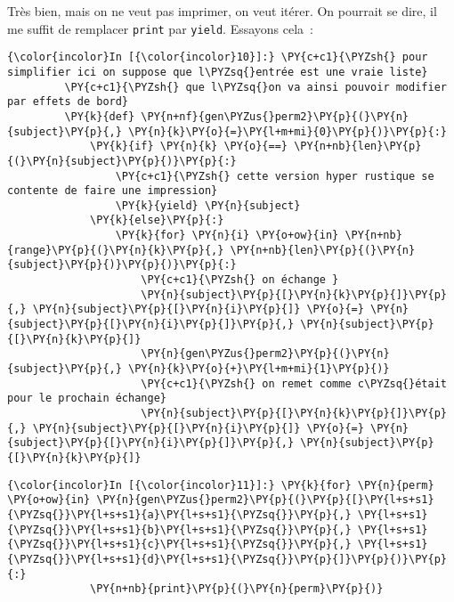     Très bien, mais on ne veut pas imprimer, on veut itérer. On pourrait se
dire, il me suffit de remplacer \texttt{print} par \texttt{yield}.
Essayons cela~:

    \begin{Verbatim}[commandchars=\\\{\}]
{\color{incolor}In [{\color{incolor}10}]:} \PY{c+c1}{\PYZsh{} pour simplifier ici on suppose que l\PYZsq{}entrée est une vraie liste}
         \PY{c+c1}{\PYZsh{} que l\PYZsq{}on va ainsi pouvoir modifier par effets de bord}
         \PY{k}{def} \PY{n+nf}{gen\PYZus{}perm2}\PY{p}{(}\PY{n}{subject}\PY{p}{,} \PY{n}{k}\PY{o}{=}\PY{l+m+mi}{0}\PY{p}{)}\PY{p}{:}
             \PY{k}{if} \PY{n}{k} \PY{o}{==} \PY{n+nb}{len}\PY{p}{(}\PY{n}{subject}\PY{p}{)}\PY{p}{:}
                 \PY{c+c1}{\PYZsh{} cette version hyper rustique se contente de faire une impression}
                 \PY{k}{yield} \PY{n}{subject}
             \PY{k}{else}\PY{p}{:}
                 \PY{k}{for} \PY{n}{i} \PY{o+ow}{in} \PY{n+nb}{range}\PY{p}{(}\PY{n}{k}\PY{p}{,} \PY{n+nb}{len}\PY{p}{(}\PY{n}{subject}\PY{p}{)}\PY{p}{)}\PY{p}{:}
                     \PY{c+c1}{\PYZsh{} on échange }
                     \PY{n}{subject}\PY{p}{[}\PY{n}{k}\PY{p}{]}\PY{p}{,} \PY{n}{subject}\PY{p}{[}\PY{n}{i}\PY{p}{]} \PY{o}{=} \PY{n}{subject}\PY{p}{[}\PY{n}{i}\PY{p}{]}\PY{p}{,} \PY{n}{subject}\PY{p}{[}\PY{n}{k}\PY{p}{]}
                     \PY{n}{gen\PYZus{}perm2}\PY{p}{(}\PY{n}{subject}\PY{p}{,} \PY{n}{k}\PY{o}{+}\PY{l+m+mi}{1}\PY{p}{)}
                     \PY{c+c1}{\PYZsh{} on remet comme c\PYZsq{}était pour le prochain échange}
                     \PY{n}{subject}\PY{p}{[}\PY{n}{k}\PY{p}{]}\PY{p}{,} \PY{n}{subject}\PY{p}{[}\PY{n}{i}\PY{p}{]} \PY{o}{=} \PY{n}{subject}\PY{p}{[}\PY{n}{i}\PY{p}{]}\PY{p}{,} \PY{n}{subject}\PY{p}{[}\PY{n}{k}\PY{p}{]}
\end{Verbatim}


    \begin{Verbatim}[commandchars=\\\{\}]
{\color{incolor}In [{\color{incolor}11}]:} \PY{k}{for} \PY{n}{perm} \PY{o+ow}{in} \PY{n}{gen\PYZus{}perm2}\PY{p}{(}\PY{p}{[}\PY{l+s+s1}{\PYZsq{}}\PY{l+s+s1}{a}\PY{l+s+s1}{\PYZsq{}}\PY{p}{,} \PY{l+s+s1}{\PYZsq{}}\PY{l+s+s1}{b}\PY{l+s+s1}{\PYZsq{}}\PY{p}{,} \PY{l+s+s1}{\PYZsq{}}\PY{l+s+s1}{c}\PY{l+s+s1}{\PYZsq{}}\PY{p}{,} \PY{l+s+s1}{\PYZsq{}}\PY{l+s+s1}{d}\PY{l+s+s1}{\PYZsq{}}\PY{p}{]}\PY{p}{)}\PY{p}{:}
             \PY{n+nb}{print}\PY{p}{(}\PY{n}{perm}\PY{p}{)}
\end{Verbatim}


